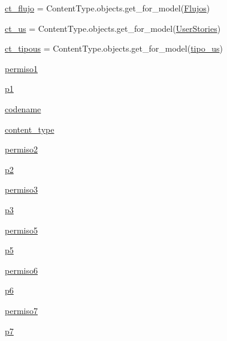 \begin{DoxyCompactItemize}
\hyperlink{namespace_gestor_proyectos_1_1views_af402baef688536526634ecdcc143a478}{ct\+\_\+flujo} = Content\+Type.\+objects.\+get\+\_\+for\+\_\+model(\hyperlink{classflujos_1_1models_1_1_flujos}{Flujos})
\item 
\hyperlink{namespace_gestor_proyectos_1_1views_a11bb41776e22ba3be21c89ced5ccbc9a}{ct\+\_\+us} = Content\+Type.\+objects.\+get\+\_\+for\+\_\+model(\hyperlink{classuser_story_1_1models_1_1_user_stories}{User\+Stories})
\item 
\hyperlink{namespace_gestor_proyectos_1_1views_a6e6e3b36c240ecc57c6ed4c9746894c0}{ct\+\_\+tipous} = Content\+Type.\+objects.\+get\+\_\+for\+\_\+model(\hyperlink{classtipo_u_s_1_1models_1_1tipo__us}{tipo\+\_\+us})
\item 
\hyperlink{namespace_gestor_proyectos_1_1views_a9f1d61ed0e927f7dc8ab9e95552bb655}{permiso1}
\item 
\hyperlink{namespace_gestor_proyectos_1_1views_af0dc402e643a0f39e00b80a143c10d61}{p1}
\item 
\hyperlink{namespace_gestor_proyectos_1_1views_aaa4ba901309d24b99e48452cb20e0e5a}{codename}
\item 
\hyperlink{namespace_gestor_proyectos_1_1views_ab28048a155616cb67bf07a6882e8d717}{content\+\_\+type}
\item 
\hyperlink{namespace_gestor_proyectos_1_1views_a19f281072259f6f6e2f5ab727b569ed8}{permiso2}
\item 
\hyperlink{namespace_gestor_proyectos_1_1views_ab05e5db5fffd326d820cfd2558aba30a}{p2}
\item 
\hyperlink{namespace_gestor_proyectos_1_1views_a9d1f532e451256272aa77712f43eb605}{permiso3}
\item 
\hyperlink{namespace_gestor_proyectos_1_1views_a8846e04883a7133a81cba7475dd8f35f}{p3}
\item 
\hyperlink{namespace_gestor_proyectos_1_1views_a812feb1ad0e919ffe362fe2dc096aa9a}{permiso5}
\item 
\hyperlink{namespace_gestor_proyectos_1_1views_a706c047c6c24dc91d4c27984323da575}{p5}
\item 
\hyperlink{namespace_gestor_proyectos_1_1views_a7cae53f730a5e92185607075cd712716}{permiso6}
\item 
\hyperlink{namespace_gestor_proyectos_1_1views_ad7cbf606ac8d632847236af7e0bb8742}{p6}
\item 
\hyperlink{namespace_gestor_proyectos_1_1views_adb1776cc2eb833ee6954074ed50481e1}{permiso7}
\item 
\hyperlink{namespace_gestor_proyectos_1_1views_a5f31e59239d3e7f66991072392702bff}{p7}

\end{DoxyCompactItemize}
